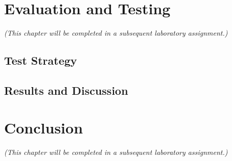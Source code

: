 \documentclass[12pt, a4paper]{report}
\begin{document}
\chapter{Evaluation and Testing}
\label{chap:eval}

\textit{(This chapter will be completed in a subsequent laboratory assignment.)}

\section{Test Strategy}

\section{Results and Discussion}

\chapter{Conclusion}
\label{chap:conclusion}

\textit{(This chapter will be completed in a subsequent laboratory assignment.)}

\end{document}
